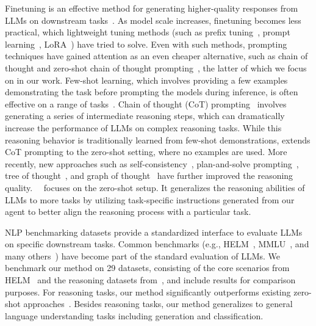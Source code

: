 Finetuning is an effective method for generating higher-quality responses from LLMs on downstream tasks~\citep{liu2019roberta, howard2018universal}. As model scale increases, finetuning becomes less practical, which lightweight tuning methods (such as prefix tuning~\citep{li2021prefixtuning}, prompt learning~\citep{lester2021power, liu2023pre}, LoRA~\citep{hu2021lora}) have tried to solve. Even with such methods, prompting techniques have gained attention as an even cheaper alternative, such as chain of thought and zero-shot chain of thought prompting~\citep{wei2023chainofthought, kojima2023large}, the latter of which we focus on in our work.
Few-shot learning, which involves providing a few examples demonstrating the task before prompting the models during inference, is often effective on a range of tasks~\citep{brown2020language, dong2023survey}. Chain of thought (CoT) prompting~\citep{wei2023chainofthought} involves generating a series of intermediate reasoning steps, which can dramatically increase the performance of LLMs on complex reasoning tasks. While this reasoning behavior is traditionally learned from few-shot demonstrations, \citet{kojima2023large} extends CoT prompting to the zero-shot setting, where no examples are used. More recently, new approaches such as self-consistency~\citep{wang2023selfconsistency}, plan-and-solve prompting~\citep{wang2023planandsolve}, tree of thought~\citep{yao2023tree}, and graph of thought~\citep{besta2023graph} have further improved the reasoning quality. \zeroshotstart\ \method\ focuses on the zero-shot setup. It generalizes the reasoning abilities of LLMs to more tasks by utilizing task-specific instructions generated from our agent to better align the reasoning process with a particular task.

NLP benchmarking datasets provide a standardized interface to evaluate LLMs on specific downstream tasks. Common benchmarks (e.g., HELM~\citep{liang2022holistic}, MMLU~\citep{hendrycks2021measuring}, and many others~\citep{shen2024measuring, yuan2024measuring, zhong2023agieval, srivastava2023imitation, suzgun2022challenging, chen2021evaluating, wang2019glue, rajpurkar-etal-2016-squad}) have become part of the standard evaluation of LLMs. We benchmark our method on 29 datasets, consisting of the core scenarios from HELM~\citep{liang2022holistic} and the reasoning datasets from~\citet{kojima2023large}, and include results for comparison purposes.
For reasoning tasks, our method significantly outperforms existing zero-shot approaches~\citep{brown2020language,kojima2023large}.
Besides reasoning tasks, our method generalizes to general language understanding tasks including generation and classification.